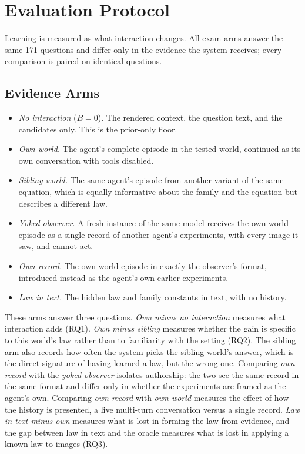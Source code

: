 \section{Evaluation Protocol}
\label{sec:protocol}

Learning is measured as what interaction changes. All exam arms answer the same 171 questions and differ only in the evidence the system receives; every comparison is paired on identical questions.

\subsection{Evidence Arms}
\label{sec:protocol:ablations}

\begin{itemize}
  \item \emph{No interaction} ($B=0$). The rendered context, the question text, and the candidates only. This is the prior-only floor.
  \item \emph{Own world.} The agent's complete episode in the tested world, continued as its own conversation with tools disabled.
  \item \emph{Sibling world.} The same agent's episode from another variant of the same equation, which is equally informative about the family and the equation but describes a different law.
  \item \emph{Yoked observer.} A fresh instance of the same model receives the own-world episode as a single record of another agent's experiments, with every image it saw, and cannot act.
  \item \emph{Own record.} The own-world episode in exactly the observer's format, introduced instead as the agent's own earlier experiments.
  \item \emph{Law in text.} The hidden law and family constants in text, with no history.
\end{itemize}

These arms answer three questions. \emph{Own minus no interaction} measures what interaction adds (RQ1). \emph{Own minus sibling} measures whether the gain is specific to this world's law rather than to familiarity with the setting (RQ2). The sibling arm also records how often the system picks the sibling world's answer, which is the direct signature of having learned a law, but the wrong one. Comparing \emph{own record} with the \emph{yoked observer} isolates authorship: the two see the same record in the same format and differ only in whether the experiments are framed as the agent's own. Comparing \emph{own record} with \emph{own world} measures the effect of how the history is presented, a live multi-turn conversation versus a single record. \emph{Law in text minus own} measures what is lost in forming the law from evidence, and the gap between law in text and the oracle measures what is lost in applying a known law to images (RQ3).

